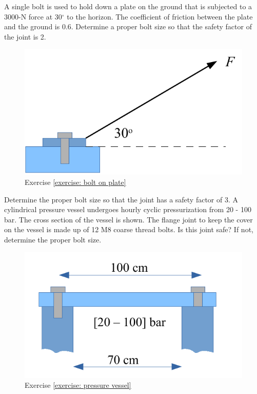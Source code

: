 \documentclass[
10pt,
a4paper,
openany,
svgnames,
]{book}
\newcommand{\exercise}{%
\item \label{lab:\arabic{chapter}.\arabic{exercisesi}}  %
}
\begin{document}
\begin{exercises}
  \exercise \label{exercise: bolt on plate} A single bolt is used to hold down a plate on the ground that is subjected to a 3000-N force at 30$^{\circ}$ to the horizon. The coefficient of friction between the plate and the ground is 0.6. Determine a proper bolt size so that the safety factor of the joint is 2.
  
  \begin{figure}[H]
    \centering
    \includegraphics[scale=0.6]{pictures/Bolt/bolt-on-plate-exercise}
    \caption{Exercise \ref{exercise: bolt on plate}}
  \end{figure}
  
  \exercise \label{exercise: pressure vessel} Determine the proper bolt size so that the joint has a safety factor of 3. A cylindrical pressure vessel undergoes hourly cyclic pressurization from 20 - 100 bar. The cross section of the vessel is shown. The flange joint to keep the cover on the vessel is made up of 12 M8 coarse thread bolts. Is this joint safe? If not, determine the proper bolt size.
  
  \begin{figure}[H]
    \centering
    \includegraphics[scale=0.6]{pictures/Bolt/pressure-vessel-exercise}
    \caption{Exercise \ref{exercise: pressure vessel}}
  \end{figure}


\end{exercises}
\end{document}
